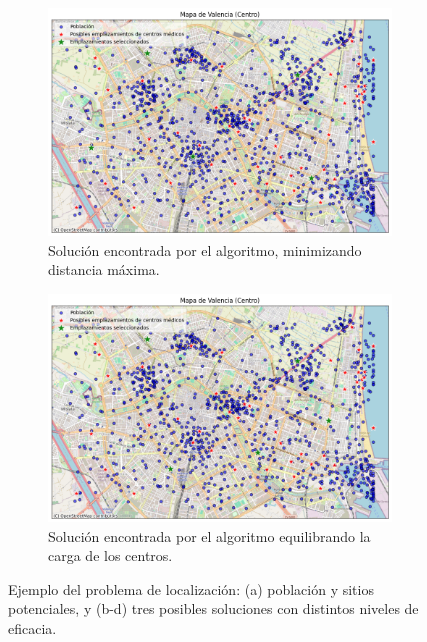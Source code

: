 \documentclass[12pt,a4paper]{book}
\begin{document}
\begin{figure}[H]
    \begin{subfigure}{0.48\textwidth}
        \includegraphics[width=\textwidth]{images/min_distancias.png}
        \caption{Solución encontrada por el algoritmo, minimizando distancia máxima.}
        \label{fig:min_distancias}
    \end{subfigure}
    \hfill
    \begin{subfigure}{0.48\textwidth}
        \includegraphics[width=\textwidth]{images/equilibrada.png}
        \caption{Solución encontrada por el algoritmo equilibrando la carga de los centros.}
        \label{fig:equilibrada}
    \end{subfigure}
    
    \caption{Ejemplo del problema de localización: (a) población y sitios potenciales, y (b-d) tres posibles soluciones con distintos niveles de eficacia.}
    \label{fig:casos_ejemplo}
\end{figure}
\end{document}
